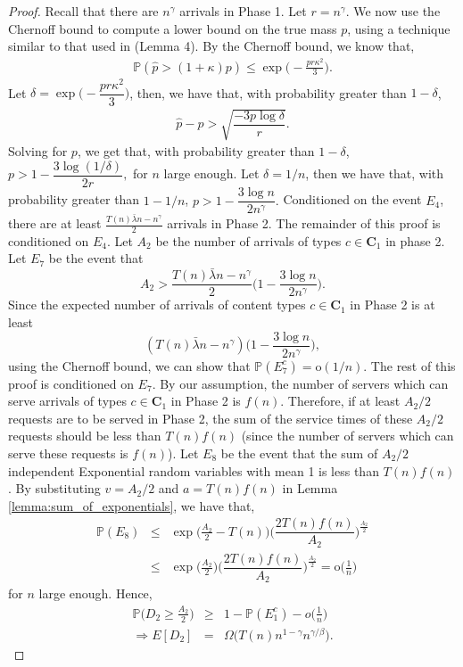 \documentclass[10pt, conference, letterpaper]{IEEEtran}
\def \oo {\mathrm{o}}
\begin{document}
\begin{proof}
	Recall that there are $n^{\gamma}$ arrivals in Phase 1. Let $r = n^{\gamma}$. We now use the Chernoff bound to compute a lower bound on the true mass $p$, using a technique similar to that used in \cite{MS00} (Lemma 4). By the Chernoff bound, we know that,
	\begin{eqnarray*}
		\mathbb{P}(\hat{p} > (1+\kappa) p) \leq \exp \bigg(-\frac{pr\kappa^2}{3} \bigg).
	\end{eqnarray*}
	Let $\delta = \exp \bigg(-\dfrac{pr\kappa^2}{3} \bigg)$, then, we have that, with probability greater than $ 1- \delta$,
	\begin{eqnarray*}
		\hat{p} - p > \sqrt{\dfrac{-3 p \log \delta}{r}}.
	\end{eqnarray*}
	Solving for $p$, we get that, with probability greater than $ 1- \delta$,
$p > 1 - \dfrac{3 \log (1/\delta)}{2r},$
for $n$ large enough.
	Let $\delta = 1/n$, then we have that, with probability greater than $ 1 - 1/n$,
$p > 1 - \dfrac{3 \log n}{2 n^{\gamma}}.$
Conditioned on the event $E_4$, there are at least $\frac{T(n) \bar{\lambda} n -  n^{\gamma}}{2} $ arrivals in Phase 2. The remainder of this proof is conditioned on $E_4$. Let $A_2$ be the number of arrivals of types $c \in \mathbf{C}_{1}$ in phase 2. Let $E_7$ be the event that
	$$A_2 > \dfrac{T(n) \bar{\lambda} n -  n^{\gamma}}{2}\bigg(1 - \dfrac{3 \log n}{2 n^{\gamma}} \bigg).$$ Since the expected number of arrivals of content types $c \in \mathbf{C}_{1}$ in Phase 2 is at least
	$$(T(n) \bar{\lambda} n - n^{\gamma})\bigg(1 - \dfrac{3 \log n}{2 n^{\gamma}} \bigg), $$
	using the Chernoff bound, we can show that
	$
	\mathbb{P}(E_7^c) = \oo(1/n).
	$
	The rest of this proof is conditioned on $E_7$.
	By our assumption, the number of servers which can serve arrivals of types $c \in \mathbf{C}_{1}$ in Phase 2 is $f(n)$. Therefore, if at least $A_2/2$ requests are to be served in Phase 2, the sum of the service times of these $A_2/2$ requests should be less than $T(n) f(n)$ (since the number of servers which can serve these requests is $f(n)$). Let $E_8$ be the event that the sum of $A_2/2$ independent Exponential random variables with mean 1 is less than $ T(n) f(n)$. By substituting $v = A_2/2$ and $a = T(n) f(n)$ in Lemma \ref{lemma:sum_of_exponentials}, we have that,
	\begin{eqnarray*}
		\mathbb{P}(E_8) &\leq& \exp\bigg(\frac{A_2}{2}-T(n)\bigg) \bigg(\dfrac{2T(n)f(n)}{A_2} \bigg)^{\frac{A_2}{2}} \\
		&\leq& \exp\bigg(\frac{A_2}{2}\bigg) \bigg(\dfrac{2T(n)f(n)}{A_2} \bigg)^{\frac{A_2}{2}} = \oo\bigg(\frac{1}{n}\bigg)
	\end{eqnarray*}
	for $n$ large enough. Hence,
	\begin{eqnarray*}
		\mathbb{P}\bigg(D_2 \geq \frac{A_2}{2}\bigg) &\geq& 1 - \mathbb{P}(E_1^c) - o\bigg(\frac{1}{n}\bigg) \\
		\Rightarrow E[D_2] &=& \Omega\big(T(n)n^{1-\gamma}n^{\gamma/\beta}\big).
	\end{eqnarray*}
\end{proof}
\end{document}
